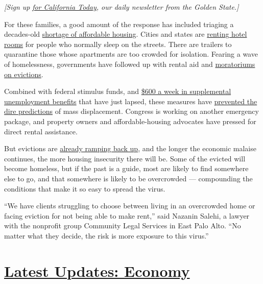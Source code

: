 \emph{{[}Sign up}
\href{https://www.nytimes.com/newsletters/california-today}{\emph{for
California Today}}\emph{, our daily newsletter from the Golden
State.{]}}

For these families, a good amount of the response has included triaging
a decades-old
\href{https://reports.nlihc.org/gap\#:~:text=The\%20U.S.\%20has\%20a\%20shortage,extremely\%20low\%2Dincome\%20renter\%20households.}{shortage
of affordable housing}. Cities and states are
\href{https://www.kqed.org/news/11825653/california-found-hotels-for-10000-homeless-residents-what-next}{renting
hotel rooms} for people who normally sleep on the streets. There are
trailers to quarantine those whose apartments are too crowded for
isolation. Fearing a wave of homelessness, governments have followed up
with rental aid and
\href{https://evictionlab.org/covid-policy-scorecard/}{moratoriums on
evictions}.

Combined with federal stimulus funds, and
\href{https://www.nytimes.com/2020/07/29/business/economy/unemployment-benefits-coronavirus.html}{\$600
a week in supplemental unemployment benefits} that have just lapsed,
these measures have
\href{https://www.nytimes.com/2020/05/31/business/economy/coronavirus-rent-landlords-tenants.html}{prevented
the dire predictions} of mass displacement. Congress is working on
another emergency package, and property owners and affordable-housing
advocates have pressed for direct rental assistance.

But evictions are
\href{https://www.nytimes.com/2020/07/23/business/evictions-moratorium-cares-act.html}{already
ramping back up}, and the longer the economic malaise continues, the
more housing insecurity there will be. Some of the evicted will become
homeless, but if the past is a guide, most are likely to find somewhere
else to go, and that somewhere is likely to be overcrowded ---
compounding the conditions that make it so easy to spread the virus.

``We have clients struggling to choose between living in an overcrowded
home or facing eviction for not being able to make rent,'' said Nazanin
Salehi, a lawyer with the nonprofit group Community Legal Services in
East Palo Alto. ``No matter what they decide, the risk is more exposure
to this virus.''

\hypertarget{latest-updates-economy}{%
\section{\texorpdfstring{\href{https://www.nytimes.com/live/2020/08/03/business/stock-market-today-coronavirus?action=click\&pgtype=Article\&state=default\&region=MAIN_CONTENT_1\&context=storylines_live_updates}{Latest
Updates:
Economy}}{Latest Updates: Economy}}\label{latest-updates-economy}}

